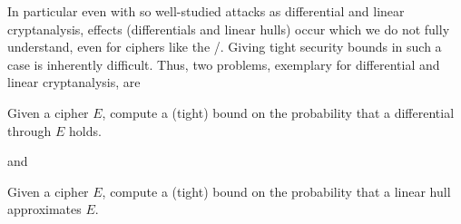 
In particular even with so well-studied attacks as differential and linear cryptanalysis, effects (differentials and linear hulls) occur which we do not fully understand, even for ciphers like the \AES/.
Giving tight security bounds in such a case is inherently difficult.
Thus, two problems, exemplary for differential and linear cryptanalysis, are
\begin{problem}[Differentials]\label{prob:differentials}
    Given a cipher $E$, compute a (tight) bound on the probability that a differential through $E$ holds.
\end{problem}
and
\begin{problem}\label{prob:linear_hulls}
    Given a cipher $E$, compute a (tight) bound on the probability that a linear hull approximates $E$.
\end{problem}

